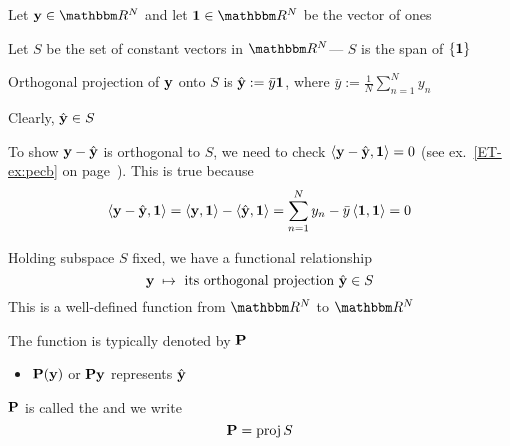 \begin{frame}

    \vspace{2em}
    \Eg
    Let $\boldy \in \RR^N$ and let $\boldone \in \RR^N$ be the vector of ones
    
    Let $S$ be the set of constant vectors in $\RR^N$--- $S$ is the span of $\{{\mathbf 1}\}$
    
    Orthogonal projection of ${\mathbf y}$ onto $S$ is $\hat {\mathbf y} := \bar y
    {\mathbf 1}$, where $\bar y := \frac{1}{N} \sum_{n=1}^N y_n$
    
    Clearly, $\hat {\mathbf y} \in S$ 
    
    \vspace{.7em}
    To show ${\mathbf y} -
    \hat {\mathbf y}$ is orthogonal to $S$, we need to check
    $\left\langle{ {\mathbf y} -  \hat {\mathbf y} ,  {\mathbf 1} }\right\rangle = 0$ (see ex.~\ref{ET-ex:pecb} on
    page~\pageref{ET-ex:pecb}).  This is true because
    \begin{equation*}
        \left\langle{ {\mathbf y} -  \hat {\mathbf y} ,  {\mathbf 1} }\right\rangle
        = \left\langle{ {\mathbf y} ,  {\mathbf 1} }\right\rangle - \left\langle{ \hat {\mathbf y} ,  {\mathbf 1} }\right\rangle
        = \sum_{n=1}^N y_n - \bar y \left\langle{ {\mathbf 1} ,  {\mathbf 1} }\right\rangle
        = 0
    \end{equation*}
    
\end{frame}

\begin{frame}
    
    \vspace{2em}
    Holding subspace $S$ fixed, we have a functional relationship
    \begin{equation*}
        {\mathbf y} \; \mapsto \text{ its orthogonal projection } \hat {{\mathbf y}} \in S
    \end{equation*}
    This is a well-defined function from $\RR^N$ to $\RR^N$
    
    \vspace{.7em}
    The function is typically denoted by $\mathbf P$

    \begin{itemize}
        \item $\mathbf P({\mathbf y})$ or $\mathbf P {\mathbf y}$ represents $\hat {\mathbf y}$
    \end{itemize}
    
    $\mathbf P$ is called the  and we write
    \begin{equation*}
        \mathbf P = \operatorname{proj} S
    \end{equation*}

\end{frame}

